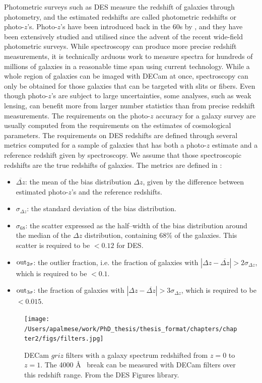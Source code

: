 Photometric surveys such as DES measure the redshift of galaxies through photometry, and the estimated redshifts are called photometric redshifts or photo-$z$'s. Photo-$z$'s have been introduced back in the 60s by \citet{baum}, and they have been extensively studied and utilised since the advent of the recent wide-field photometric surveys. While spectroscopy can produce more precise redshift measurements, it is technically arduous work to measure spectra for hundreds of millions of galaxies in a reasonable time span using current technology. While a whole region of galaxies can be imaged with DECam at once, spectroscopy can only be obtained for those galaxies that can be targeted with slits or fibers. Even though photo-$z$'s are subject to large uncertainties, some analyses, such as weak lensing, can benefit more from larger number statistics than from precise redshift measurements. The requirements on the photo-$z$ accuracy for a galaxy survey are usually computed from the requirements on the estimates of cosmological parameters. The requirements on DES redshifts are defined through several metrics computed for a sample of galaxies that has both a photo-$z$ estimate and a reference redshift given by spectroscopy. We assume that those spectroscopic redshifts are the true redshifts of galaxies. The metrics are defined in \citet{sanchez}:
\begin{itemize}
\item $\overline{\Delta z}$: the mean of the bias distribution $\Delta z$, given by the difference between estimated photo-$z$'s and the reference redshifts.
\item $\sigma_{\Delta z}$: the standard deviation of the bias distribution.
\item $\sigma_{68}$: the scatter expressed as the half--width of the bias distribution around the median of the $\Delta z$ distribution, containing $68\%$ of the galaxies. This scatter is required to be $<0.12$ for DES.
\item ${\rm out}_{2\sigma}$: the outlier fraction, i.e. the fraction of galaxies with $|\Delta z - \overline{\Delta z}|>2\sigma_{\Delta z}$, which is required to be $<0.1$.
\item ${\rm out}_{3\sigma}$: the fraction of galaxies with $|\Delta z - \overline{\Delta z}|>3\sigma_{\Delta z}$, which is required to be $<0.015$.
\end{itemize}

\begin{figure}\centering
\texttt{[image: /Users/apalmese/work/PhD\_thesis/thesis\_format/chapters/chapter2/figs/filters.jpg]}\caption{DECam $griz$ filters with a galaxy spectrum redshifted from $z=0$ to $z=1$. The 4000 \AA~ break can be measured with DECam filters over this redshift range. From the DES Figures library.}\label{fig:filtersz}
\end{figure}

